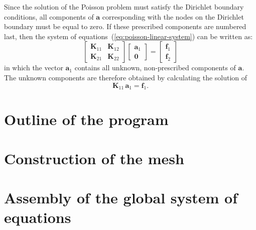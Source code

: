 \BlankLine
Since the solution of the Poisson problem must satisfy the Dirichlet
boundary conditions, all components of $\bm{a}$ corresponding with the
nodes on the Dirichlet boundary must be equal to zero. If these
prescribed components are numbered last, then the system of
equations~(\ref{eq:poisson-linear-system}) can be written as:
\begin{displaymath}
  \left[
    \begin{array}{cc}
      \bm{K}_{11} & \bm{K}_{12} \\
      \bm{K}_{21} & \bm{K}_{22}
    \end{array}
  \right] \left[
    \begin{array}{c}
      \bm{a}_{1} \\
      \bm{0}
    \end{array}
  \right] = \left[
    \begin{array}{c}
      \bm{f}_{1} \\
      \bm{f}_{2}
    \end{array}
  \right]
\end{displaymath}
in which the vector $\bm{a}_{1}$ contains all unknown, non-prescribed
components of $\bm{a}$. The unknown components are therefore obtained
by calculating the solution of
\begin{displaymath}
  \bm{K}_{11} \, \bm{a}_{1} = \bm{f}_{1}.
\end{displaymath}



\section{Outline of the program}
\label{section:poisson:program-outline}



\section{Construction of the mesh}
\label{section:poisson:mesh-construction}



\section{Assembly of the global system of equations}
\label{section:poisson:assembly}


